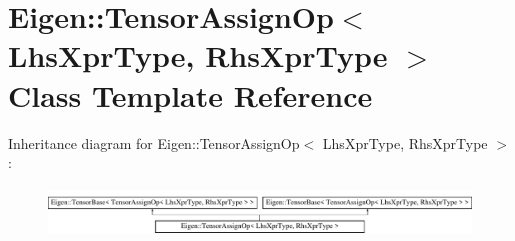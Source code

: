 \hypertarget{class_eigen_1_1_tensor_assign_op}{}\section{Eigen\+:\+:Tensor\+Assign\+Op$<$ Lhs\+Xpr\+Type, Rhs\+Xpr\+Type $>$ Class Template Reference}
\label{class_eigen_1_1_tensor_assign_op}
Inheritance diagram for Eigen\+:\+:Tensor\+Assign\+Op$<$ Lhs\+Xpr\+Type, Rhs\+Xpr\+Type $>$\+:\begin{figure}[H]
\begin{center}
\leavevmode
\includegraphics[height=1.349398cm]{class_eigen_1_1_tensor_assign_op}
\end{center}
\end{figure}
